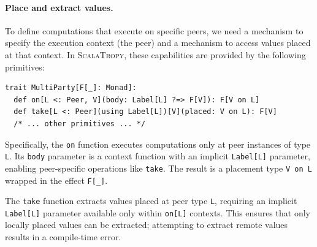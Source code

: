 \documentclass[runningheads]{llncs}
\newcommand{\ourLang}{\textsc{ScalaTropy}}
\newcommand{\code}[1]{\lstinline[style=scala3,basicstyle=\ttfamily\small\color{vscLightText}]{#1}}
\begin{document}



\paragraph{Place and extract values.}
To define computations that execute on specific peers,
we need a mechanism to specify the execution context (the peer)
and a mechanism to access values placed at that context.
In \ourLang{},
these capabilities are provided by the following primitives:
\begin{lstlisting}[style=scala3]
trait MultiParty[F[_]: Monad]:
  def on[L <: Peer, V](body: Label[L] ?=> F[V]): F[V on L]
  def take[L <: Peer](using Label[L])[V](placed: V on L): F[V]
  /* ... other primitives ... */
\end{lstlisting}
Specifically, the \code{on} function executes computations only at peer instances of type \code{L}.
Its \code{body} parameter is a context function with an implicit \code{Label[L]} parameter,
enabling peer-specific operations like \code{take}.
The result is a placement type \code{V on L} wrapped in the effect \code{F[_]}.

The \code{take} function extracts values placed at peer type \code{L},
requiring an implicit \code{Label[L]} parameter available only within \code{on[L]} contexts.
This ensures that only locally placed values can be extracted;
attempting to extract remote values results in a compile-time error.
\end{document}
